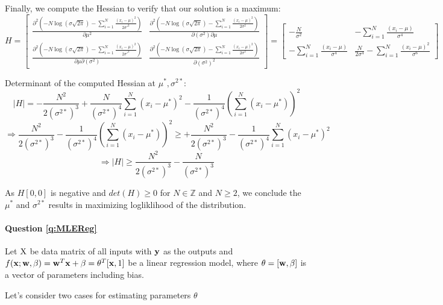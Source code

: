    Finally, we compute the Hessian to verify that our solution is a maximum:
    $$H = \begin{bmatrix}
            \frac{\partial^2 (-N \log (\sigma \sqrt{2\pi}) - \sum_{i=1}^N \frac{(x_i - \mu)^2}{2\sigma'^2})}{\partial \mu^2} & 
            \frac{\partial^2 (-N \log (\sigma \sqrt{2\pi}) - \sum_{i=1}^N \frac{(x_i - \mu)^2}{2\sigma^2})}{\partial (\sigma^2) \partial \mu} \\ 
            \frac{\partial^2 (-N \log (\sigma \sqrt{2\pi}) - \sum_{i=1}^N \frac{(x_i - \mu)^2}{2\sigma'^2})}{\partial \mu \partial (\sigma^2)} & 
            \frac{\partial^2 (-N \log (\sigma \sqrt{2\pi}) - \sum_{i=1}^N \frac{(x_i - \mu)^2}{2\sigma^2})}{\partial (\sigma^2)^2} 
        \end{bmatrix} = 
        \begin{bmatrix} 
            -\frac{N}{\sigma^2} &  
            - \sum_{i=1}^N \frac{(x_i - \mu)}{\sigma^4} \\ 
            - \sum_{i=1}^N \frac{(x_i - \mu) }{\sigma^4} & 
            \frac{N}{2 \sigma^4} - \sum_{i=1}^N \frac{(x_i - \mu)^2}{\sigma^6} 
        \end{bmatrix}$$
    
    Determinant of the computed Hessian at $\mu^*, \sigma^{2*}$:
    $$ |H| = -\frac{N^2}{2 (\sigma^{2*})^3} + \frac{N}{(\sigma^{2*})^4} \sum_{i=1}^N (x_i - \mu^*)^2 - \frac{1}{(\sigma^{2*})^4} (\sum_{i=1}^N(x_i - \mu^*))^2$$
    $$\Rightarrow \frac{N^2}{2 (\sigma^{2*})^3} - \frac{1}{(\sigma^{2*})^4} (\sum_{i=1}^N(x_i - \mu^*))^2 \geq +\frac{N^2}{2 (\sigma^{2*})^3} - \frac{1}{(\sigma^{2*})^4} \sum_{i=1}^N(x_i - \mu^*)^2$$
    $$\Rightarrow |H| \geq \frac{N^2}{2 (\sigma^{2*})^3} - \frac{N}{(\sigma^{2*})^3}$$
    
    As $H[0,0]$ is negative and $det(H) \geq 0$ for $N \in \mathbb{Z}$ and $N \geq 2$, we conclude the $\mu^*$ and $\sigma^{2*}$ results in maximizing logliklihood of the distribution.

    
    

\paragraph{Question \ref{q:MLEReg}}

Let ${\mathrm{{X}}}$ be data matrix of all inputs with $\mathbf{y}$ as the outputs and $f(\mathbf{x}; \mathbf{w}, \beta) = \mathbf{w}^T\mathbf{x} + \beta = \theta^T[\mathbf{x}, 1]$ be a linear regression model, where $\theta=[\mathbf{w}, \beta]$ is a vector of parameters including bias.

Let's consider two cases for estimating parameters $\theta$

